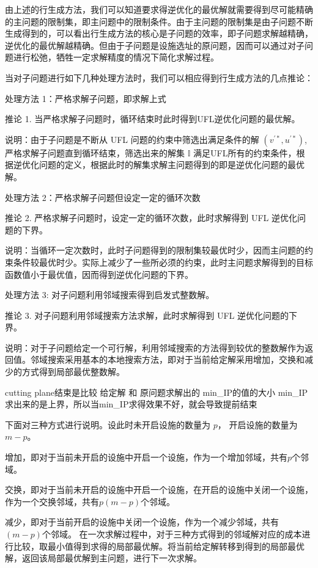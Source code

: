 \documentclass[UTF8]{article}
\begin{document}
由上述的行生成方法，我们可以知道要求得逆优化的最优解就需要得到尽可能精确的主问题的限制集，即主问题中的限制条件。由于主问题的限制集是由子问题不断生成得到的，可以看出行生成方法的核心是子问题的效率，即子问题求解越精确，逆优化的最优解越精确。但由于子问题是设施选址的原问题，因而可以通过对子问题进行松弛，牺牲一定求解精度的情况下简化求解过程。

当对子问题进行如下几种处理方法时，我们可以相应得到行生成方法的几点推论：

处理方法 1：严格求解子问题，即求解上式

推论 1. 当严格求解子问题时，循环结束时此时得到UFL逆优化问题的最优解。

说明：由于子问题是不断从 UFL 问题的约束中筛选出满足条件的解 $(v^{'*},u^{'*})$, 严格求解子问题直到循环结束，筛选出来的解集 $\mathbb{I}$ 满足UFL所有的约束条件，根据逆优化问题的定义，根据此时的解集求解主问题得到的即是逆优化问题的最优解。

处理方法 2：严格求解子问题但设定一定的循环次数

推论 2. 严格求解子问题时，设定一定的循环次数，此时求解得到 UFL 逆优化问题的下界。

说明：当循环一定次数时，此时子问题得到的限制集较最优时少，因而主问题的约束条件较最优时少。实际上减少了一些所必须的约束，此时主问题求解得到的目标函数值小于最优值，因而得到逆优化问题的下界。

处理方法 3: 对子问题利用邻域搜索得到启发式整数解。

推论 3. 对子问题利用邻域搜索方法求解，此时求解得到 UFL 逆优化问题的下界。

说明：对于子问题给定一个可行解，利用邻域搜索的方法得到较优的整数解作为返回值。邻域搜索采用基本的本地搜索方法，即对于当前给定解采用增加，交换和减少的方式得到局部最优整数解。

cutting plane结束是比较 给定解 和 原问题求解出的 min_IP的值的大小
min_IP求出来的是上界，所以当min_IP求得效果不好，就会导致提前结束

下面对三种方式进行说明。设此时未开启设施的数量为 $p$， 开启设施的数量为$m-p$。

增加，即对于当前未开启的设施中开启一个设施，作为一个增加邻域，共有$p$个邻域。

交换，即对于当前未开启的设施中开启一个设施，在开启的设施中关闭一个设施，作为一个交换邻域，共有$p(m-p)$个邻域。

减少，即对于当前开启的设施中关闭一个设施，作为一个减少邻域，共有$(m-p)$个邻域。
在一次求解过程中，对于三种方式得到的邻域解对应的成本进行比较，取最小值得到求得的局部最优解。将当前给定解转移到得到的局部最优解，返回该局部最优解到主问题，进行下一次求解。
\end{document}

